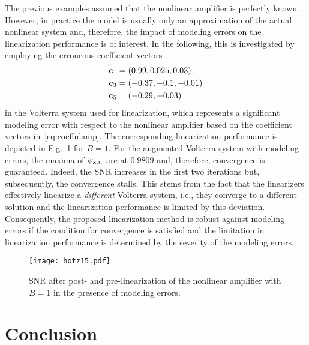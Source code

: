 \documentclass[10pt,twocolumn,twoside]{IEEEtran}
\begin{document}
The previous examples assumed that the nonlinear amplifier is perfectly
known. However, in practice the model is usually only an
approximation of the actual nonlinear system and, therefore, the impact of
modeling errors on the linearization performance is of interest.
In the following, this is investigated by employing the erroneous coefficient vectors
\begin{align*}
	\bm{\mathrm{c}}_1 &= ( 0.99,  0.025,  0.03)\\
	\bm{\mathrm{c}}_3 &= (-0.37, -0.1,   -0.01)\\
	\bm{\mathrm{c}}_5 &= (-0.29, -0.03)
\end{align*}
in the Volterra system used for linearization, which represents
a significant modeling error with respect to the nonlinear amplifier
based on the coefficient vectors in~\eqref{eq:coeffnlamp}. The
corresponding linearization performance is depicted in Fig.~\ref{fig:snrb1:moderr}
for $B=1$. For the augmented Volterra system with modeling errors, the maxima of
$\psi_{\mathrm{x},n}$ are at $0.9809$ and, therefore, convergence is guaranteed.
Indeed, the SNR increases in the first two iterations but, subsequently,
the convergence stalls. This stems from the
fact that the linearizers effectively linearize a \emph{different} Volterra
system, i.e., they converge to a different solution and the linearization
performance is limited by this deviation. Consequently, the
proposed linearization method is robust against modeling errors if the
condition for convergence is satisfied and the limitation in linearization
performance is determined by the severity of the modeling errors.

\begin{figure}[!t]\centering \texttt{[image: hotz15.pdf]}\caption{SNR after post- and pre-linearization of the nonlinear amplifier with $B=1$
	in the presence of modeling errors.}\label{fig:snrb1:moderr}\end{figure}



\section{Conclusion}
	\label{conclusion}
\end{document}
